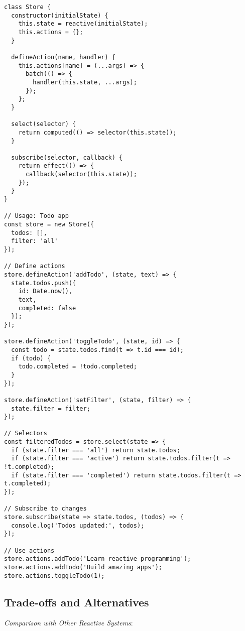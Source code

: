 \documentclass[11pt]{article}
\begin{document}
\begin{verbatim}
class Store {
  constructor(initialState) {
    this.state = reactive(initialState);
    this.actions = {};
  }
  
  defineAction(name, handler) {
    this.actions[name] = (...args) => {
      batch(() => {
        handler(this.state, ...args);
      });
    };
  }
  
  select(selector) {
    return computed(() => selector(this.state));
  }
  
  subscribe(selector, callback) {
    return effect(() => {
      callback(selector(this.state));
    });
  }
}

// Usage: Todo app
const store = new Store({
  todos: [],
  filter: 'all'
});

// Define actions
store.defineAction('addTodo', (state, text) => {
  state.todos.push({
    id: Date.now(),
    text,
    completed: false
  });
});

store.defineAction('toggleTodo', (state, id) => {
  const todo = state.todos.find(t => t.id === id);
  if (todo) {
    todo.completed = !todo.completed;
  }
});

store.defineAction('setFilter', (state, filter) => {
  state.filter = filter;
});

// Selectors
const filteredTodos = store.select(state => {
  if (state.filter === 'all') return state.todos;
  if (state.filter === 'active') return state.todos.filter(t => !t.completed);
  if (state.filter === 'completed') return state.todos.filter(t => t.completed);
});

// Subscribe to changes
store.subscribe(state => state.todos, (todos) => {
  console.log('Todos updated:', todos);
});

// Use actions
store.actions.addTodo('Learn reactive programming');
store.actions.addTodo('Build amazing apps');
store.actions.toggleTodo(1);
\end{verbatim}
\subsection{Trade-offs and Alternatives}
\label{sec:org832b816}

\emph{Comparison with Other Reactive Systems}:
\end{document}
